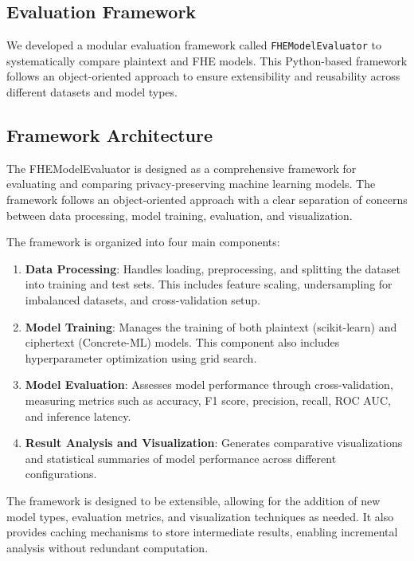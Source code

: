 \documentclass[a4paper,12pt]{article}
\begin{document}
\subsection{Evaluation Framework}
We developed a modular evaluation framework called \texttt{FHEModelEvaluator} to systematically compare plaintext and FHE models. This Python-based framework follows an object-oriented approach to ensure extensibility and reusability across different datasets and model types.

\subsection{Framework Architecture}
The FHEModelEvaluator is designed as a comprehensive framework for evaluating and comparing privacy-preserving machine learning models. The framework follows an object-oriented approach with a clear separation of concerns between data processing, model training, evaluation, and visualization.

The framework is organized into four main components:

\begin{enumerate}
    \item \textbf{Data Processing}: Handles loading, preprocessing, and splitting the dataset into training and test sets. This includes feature scaling, undersampling for imbalanced datasets, and cross-validation setup.
    
    \item \textbf{Model Training}: Manages the training of both plaintext (scikit-learn) and ciphertext (Concrete-ML) models. This component also includes hyperparameter optimization using grid search.
    
    \item \textbf{Model Evaluation}: Assesses model performance through cross-validation, measuring metrics such as accuracy, F1 score, precision, recall, ROC AUC, and inference latency.
    
    \item \textbf{Result Analysis and Visualization}: Generates comparative visualizations and statistical summaries of model performance across different configurations.
\end{enumerate}

The framework is designed to be extensible, allowing for the addition of new model types, evaluation metrics, and visualization techniques as needed. It also provides caching mechanisms to store intermediate results, enabling incremental analysis without redundant computation.
\end{document}
